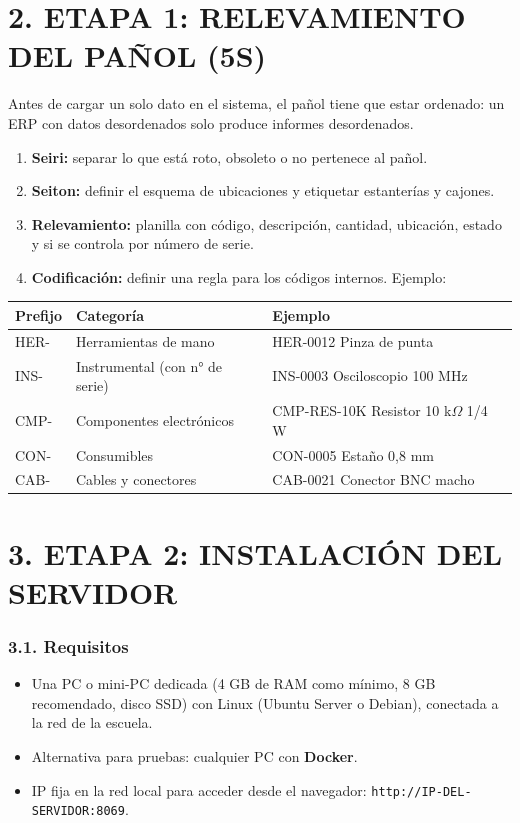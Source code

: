\section*{2. ETAPA 1: RELEVAMIENTO DEL PAÑOL (5S)}

Antes de cargar un solo dato en el sistema, el pañol tiene que estar ordenado: un ERP con datos
desordenados solo produce informes desordenados.

\begin{enumerate}
  \item \textbf{Seiri:} separar lo que está roto, obsoleto o no pertenece al pañol.
  \item \textbf{Seiton:} definir el esquema de ubicaciones y etiquetar estanterías y cajones.
  \item \textbf{Relevamiento:} planilla con código, descripción, cantidad, ubicación, estado y
        si se controla por número de serie.
  \item \textbf{Codificación:} definir una regla para los códigos internos. Ejemplo:
\end{enumerate}

\begin{center}
\small
\begin{tabular}{|l|l|l|}
\hline
\textbf{Prefijo} & \textbf{Categoría} & \textbf{Ejemplo} \\ \hline
HER- & Herramientas de mano & HER-0012 Pinza de punta \\ \hline
INS- & Instrumental (con n° de serie) & INS-0003 Osciloscopio 100 MHz \\ \hline
CMP- & Componentes electrónicos & CMP-RES-10K Resistor 10 k$\Omega$ 1/4 W \\ \hline
CON- & Consumibles & CON-0005 Estaño 0,8 mm \\ \hline
CAB- & Cables y conectores & CAB-0021 Conector BNC macho \\ \hline
\end{tabular}
\end{center}

\section*{3. ETAPA 2: INSTALACIÓN DEL SERVIDOR}

\subsubsection*{3.1. Requisitos}
\begin{itemize}
  \item Una PC o mini-PC dedicada (4 GB de RAM como mínimo, 8 GB recomendado, disco SSD) con
        Linux (Ubuntu Server o Debian), conectada a la red de la escuela.
  \item Alternativa para pruebas: cualquier PC con \textbf{Docker}.
  \item IP fija en la red local para acceder desde el navegador:
        \texttt{http://IP-DEL-SERVIDOR:8069}.
\end{itemize}

